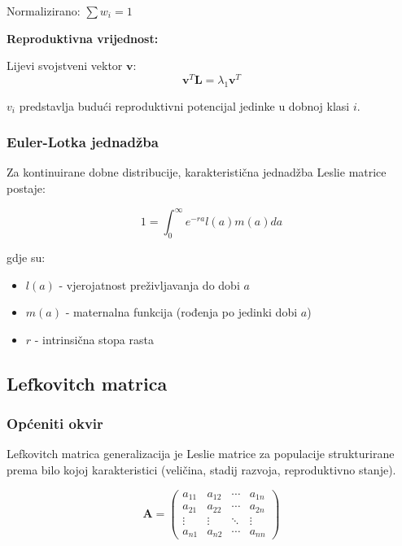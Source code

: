 \documentclass[11pt,oneside]{book}
\begin{document}
Normalizirano: $\sum w_i = 1$

\textbf{Reproduktivna vrijednost:}

Lijevi svojstveni vektor $\mathbf{v}$:
\begin{equation}
	\mathbf{v}^T \mathbf{L} = \lambda_1 \mathbf{v}^T
\end{equation}

$v_i$ predstavlja budući reproduktivni potencijal jedinke u dobnoj klasi $i$.

\subsubsection{Euler-Lotka jednadžba}

Za kontinuirane dobne distribucije, karakteristična jednadžba Leslie matrice postaje:

\begin{equation}
	1 = \int_0^{\infty} e^{-ra} l(a) m(a) da
\end{equation}

gdje su:
\begin{itemize}
	\item $l(a)$ - vjerojatnost preživljavanja do dobi $a$
	\item $m(a)$ - maternalna funkcija (rođenja po jedinki dobi $a$)
	\item $r$ - intrinsična stopa rasta
\end{itemize}

\subsection{Lefkovitch matrica}

\subsubsection{Općeniti okvir}

Lefkovitch matrica generalizacija je Leslie matrice za populacije strukturirane prema bilo kojoj karakteristici (veličina, stadij razvoja, reproduktivno stanje).

\begin{equation}
	\mathbf{A} = \begin{pmatrix}
		a_{11} & a_{12} & \cdots & a_{1n} \\
		a_{21} & a_{22} & \cdots & a_{2n} \\
		\vdots & \vdots & \ddots & \vdots \\
		a_{n1} & a_{n2} & \cdots & a_{nn}
	\end{pmatrix}
\end{equation}
\end{document}
